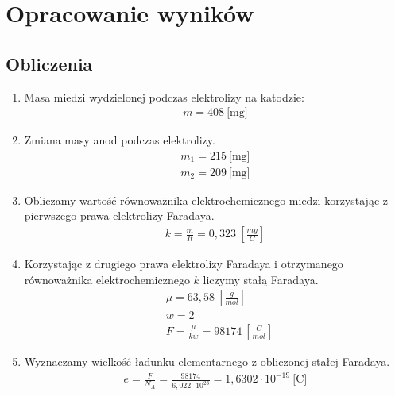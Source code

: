 \documentclass{article}
\begin{document}

\section{Opracowanie wyników}
\subsection{Obliczenia}
\begin{enumerate}
	\item Masa miedzi wydzielonej podczas elektrolizy na katodzie:
	\begin{align*} m = 408\ \mbox{[mg]}\end{align*}
	\item Zmiana masy anod podczas elektrolizy.
	\begin{align*} m_{1} = 215\ \mbox{[mg]} \\
	 m_{2} = 209\ \mbox{[mg]}\end{align*}
	\item Obliczamy wartość równoważnika elektrochemicznego miedzi korzystając z pierwszego prawa elektrolizy Faradaya.
	\begin{align*} k = \frac{m}{It} = 0,323\ \left [\frac{mg}{C} \right ]\end{align*}
	\item Korzystając z drugiego prawa elektrolizy Faradaya i otrzymanego równoważnika elektrochemicznego $k$ liczymy stałą Faradaya.
	\begin{align*} & \mu = 63,58\ \left[\frac{g}{mol} \right ] \\ & w = 2 \\ & F = \frac{\mu}{kw} = 98174\ \left[\frac{C}{mol} \right ] \end{align*}
	\item Wyznaczamy wielkość ładunku elementarnego z obliczonej stałej Faradaya.
	\begin{align*}e = \frac{F}{N_{A}} = \frac{98174}{6,022\cdot 10^{23}} = 1,6302 \cdot 10^{-19}\ \mbox{[C]} \end{align*}
\end{enumerate}
\pagebreak
\end{document}
